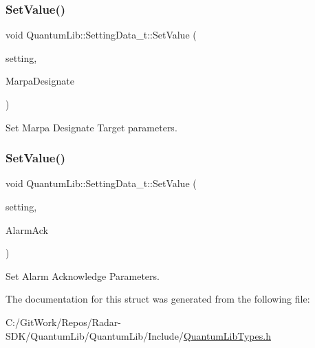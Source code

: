 \subsubsection{\texorpdfstring{Set\+Value()}{SetValue()}\hspace{0.1cm}{\footnotesize\ttfamily [25/26]}}
{\footnotesize\ttfamily void Quantum\+Lib\+::\+Setting\+Data\+\_\+t\+::\+Set\+Value (\begin{DoxyParamCaption}\item[{\mbox{\hyperlink{namespace_quantum_lib_acc8124e3e65bca4aa798d03a55e3d54c}{e\+Settings\+\_\+t}}}]{setting,  }\item[{\mbox{\hyperlink{struct_quantum_lib_1_1_marpa_designate__t}{Marpa\+Designate\+\_\+t}} \&}]{Marpa\+Designate }\end{DoxyParamCaption})\hspace{0.3cm}{\ttfamily [inline]}}



Set Marpa Designate Target parameters. 

\mbox{\label{struct_quantum_lib_1_1_setting_data__t_a5b3f0fe0ea0bc8b0382615ba53deb659}} 
\subsubsection{\texorpdfstring{Set\+Value()}{SetValue()}\hspace{0.1cm}{\footnotesize\ttfamily [26/26]}}
{\footnotesize\ttfamily void Quantum\+Lib\+::\+Setting\+Data\+\_\+t\+::\+Set\+Value (\begin{DoxyParamCaption}\item[{\mbox{\hyperlink{namespace_quantum_lib_acc8124e3e65bca4aa798d03a55e3d54c}{e\+Settings\+\_\+t}}}]{setting,  }\item[{\mbox{\hyperlink{struct_quantum_lib_1_1_alarm_ack__t}{Alarm\+Ack\+\_\+t}} \&}]{Alarm\+Ack }\end{DoxyParamCaption})\hspace{0.3cm}{\ttfamily [inline]}}



Set Alarm Acknowledge Parameters. 



The documentation for this struct was generated from the following file\+:\begin{DoxyCompactItemize}
\item 
C\+:/\+Git\+Work/\+Repos/\+Radar-\/\+S\+D\+K/\+Quantum\+Lib/\+Quantum\+Lib/\+Include/\mbox{\hyperlink{_quantum_lib_types_8h}{Quantum\+Lib\+Types.\+h}}\end{DoxyCompactItemize}
